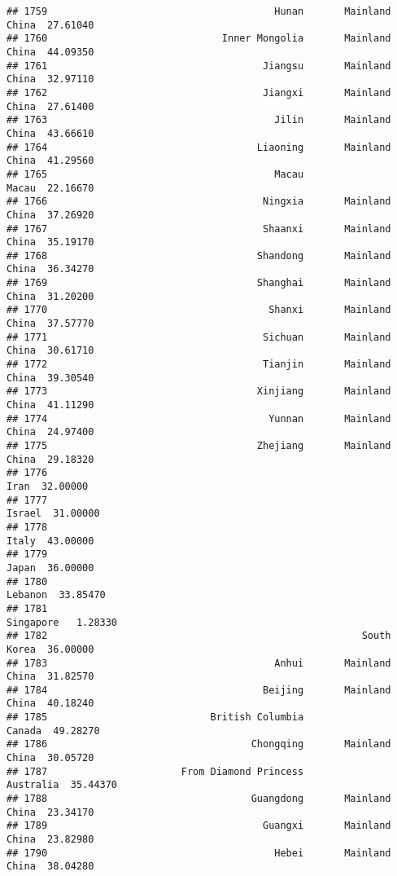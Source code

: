\documentclass[
]{article}
\begin{document}
\begin{verbatim}
## 1759                                       Hunan       Mainland China  27.61040
## 1760                              Inner Mongolia       Mainland China  44.09350
## 1761                                     Jiangsu       Mainland China  32.97110
## 1762                                     Jiangxi       Mainland China  27.61400
## 1763                                       Jilin       Mainland China  43.66610
## 1764                                    Liaoning       Mainland China  41.29560
## 1765                                       Macau                Macau  22.16670
## 1766                                     Ningxia       Mainland China  37.26920
## 1767                                     Shaanxi       Mainland China  35.19170
## 1768                                    Shandong       Mainland China  36.34270
## 1769                                    Shanghai       Mainland China  31.20200
## 1770                                      Shanxi       Mainland China  37.57770
## 1771                                     Sichuan       Mainland China  30.61710
## 1772                                     Tianjin       Mainland China  39.30540
## 1773                                    Xinjiang       Mainland China  41.11290
## 1774                                      Yunnan       Mainland China  24.97400
## 1775                                    Zhejiang       Mainland China  29.18320
## 1776                                                             Iran  32.00000
## 1777                                                           Israel  31.00000
## 1778                                                            Italy  43.00000
## 1779                                                            Japan  36.00000
## 1780                                                          Lebanon  33.85470
## 1781                                                        Singapore   1.28330
## 1782                                                      South Korea  36.00000
## 1783                                       Anhui       Mainland China  31.82570
## 1784                                     Beijing       Mainland China  40.18240
## 1785                            British Columbia               Canada  49.28270
## 1786                                   Chongqing       Mainland China  30.05720
## 1787                       From Diamond Princess            Australia  35.44370
## 1788                                   Guangdong       Mainland China  23.34170
## 1789                                     Guangxi       Mainland China  23.82980
## 1790                                       Hebei       Mainland China  38.04280

\end{verbatim}
\end{document}

